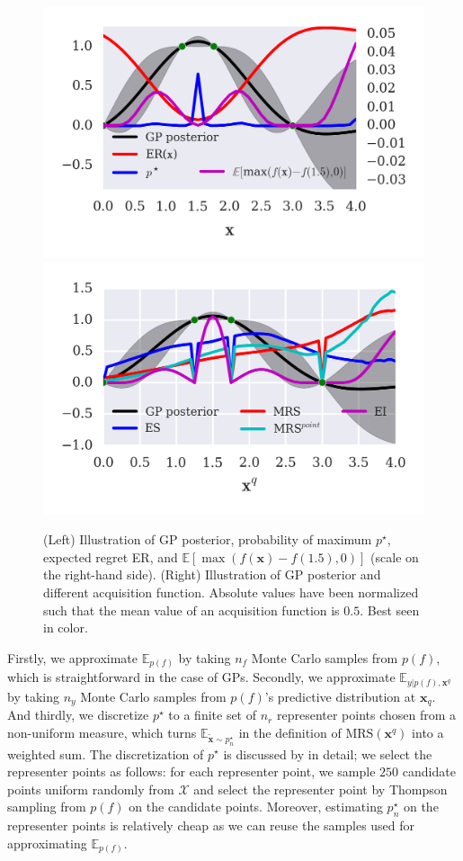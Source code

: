 \documentclass[10pt,letterpaper]{article} %
\begin{document}
\begin{figure}
\centering
\includegraphics{regret_illustration}
\includegraphics{acq_comparison}
\caption{(Left) Illustration of GP posterior, probability of maximum $p^\star$, expected regret ER, and  $\mathbb{E}[\max(f(\mathbf{x}) - f(1.5), 0)]$ (scale on the right-hand side). (Right) Illustration of GP posterior and different acquisition function. Absolute values have been normalized such that the mean value of an acquisition function is $0.5$. Best seen in color.}
\label{fig:MRS_illustration}
\end{figure}

Firstly, we approximate $\mathbb{E}_{p(f)}$ by taking $n_f$ Monte Carlo samples
from $p(f)$, which is straightforward in the case of GPs.
Secondly, we approximate $\mathbb{E}_{y \vert p(f), \mathbf{x}^q}$  by taking
$n_y$ Monte Carlo samples from $p(f)$'s predictive distribution at
$\mathbf{x}_q$. And thirdly, we discretize $p^\star$ to a finite set of $n_r$
representer points chosen from a non-uniform measure, which turns
$\mathbb{E}_{\mathbf{\tilde x} \sim p^\star_n}$ in the definition of
$\text{MRS}(\mathbf{x}^q)$ into a weighted sum. The discretization of $p^\star$ is discussed by
\citet{hennig_entropy_2012} in detail; we select the representer points as
follows: for each representer point, we sample $250$ candidate points uniform
randomly from $\mathcal{X}$ and select the representer point by Thompson
sampling from $p(f)$ on the candidate points. Moreover, estimating $p^\star_n$ on the
representer points is relatively cheap as we can reuse the samples used for approximating $\mathbb{E}_{p(f)}$.
\end{document}
